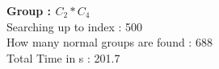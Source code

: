 \textbf{Group : $C_2*C_4$}\\
Searching up to index : 500\\
How many normal groups are found : 688\\
Total Time in s : 201.7\\
